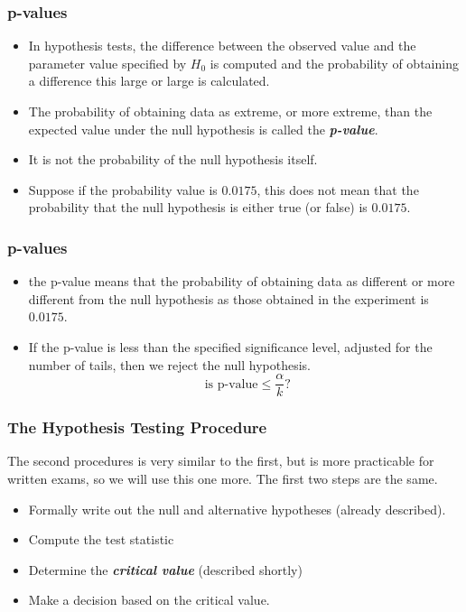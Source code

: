 \documentclass[a4]{beamer}
\begin{document}
\begin{frame}
\frametitle{p-values}
\begin{itemize}
\item In hypothesis tests, the difference between the observed value and the parameter value specified by $H_0$ is computed and the probability of obtaining a difference this large or large is calculated.
\item The probability of obtaining data as extreme, or more extreme, than the expected value under the null hypothesis is called the \textbf{\emph{p-value}}.
\item It is not the probability of the null hypothesis itself.
\item Suppose if the probability value is $0.0175$, this does not mean that the probability that the null hypothesis is either true (or false) is $0.0175$.

\end{itemize}
\end{frame}
\begin{frame}
\frametitle{p-values}
\begin{itemize}
\item the p-value means that the probability of obtaining data as different or more different from the null hypothesis as those obtained in the experiment is $0.0175$.
\item If the p-value is less than the specified significance level, adjusted for the number of tails, then we reject the null hypothesis.
\[\mbox{ is p-value} \leq \frac{\alpha}{k} \mbox{?}\]
\end{itemize}
\end{frame}

\begin{frame}
\frametitle{The Hypothesis Testing Procedure }
The second procedures is very similar to the first, but is more practicable for written exams, so we will use this one more. The first two steps are the same.

\begin{itemize}
\item Formally write out the null and alternative hypotheses (already described).
\item Compute the test statistic
\item Determine the \emph{\textbf{critical value}} (described shortly)
\item Make a decision based on the critical value.
\end{itemize}
\end{frame}
\end{document}
